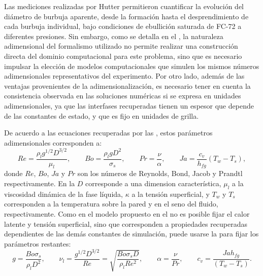 Las mediciones realizadas por Hutter permitieron cuantificar la evoluci\'on del di\'ametro de burbuja aparente, desde la formaci\'on hasta el desprendimiento de cada burbuja individual, bajo condiciones de ebullici\'on saturada de FC-72 a diferentes presiones. Sin embargo, como se detalla en el , la naturaleza adimensional del formalismo utilizado no permite realizar una construcci\'on directa del dominio computacional para este problema, sino que es necesario impulsar la elecci\'on de modelos computacionales que simulen los mismos n\'umeros adimensionales representativos del experimento. Por otro lado, adem\'as de las ventajas provenientes de la adimensionalizaci\'on, es necesario tener en cuenta la consistencia observada en las soluciones num\'ericas si se expresa en unidades adimensionales, ya que las interfases recuperadas tienen un espesor que depende de las constantes de estado, y que es fijo en unidades de grilla.

De acuerdo a las ecuaciones recuperadas por las \lbe{}, estos par\'ametros adimensionales corresponden a:
\begin{equation}
	Re = \dfrac{\rho_l g^{1/2} D^{3/2}}{\mu_l}, \qquad
	Bo = \dfrac{\rho_l g D^2}{\sigma_s}, \qquad
	Pr = \dfrac{\nu}{\alpha}, \qquad
	Ja = \dfrac{c_v}{h_{fg}}(T_w-T_s),
	\label{eq:num_adim_hetb_3D}
\end{equation}
donde $Re$, $Bo$, $Ja$ y $Pr$ son los n\'umeros de Reynolds, Bond, Jacob y Prandtl respectivamente. En la  $D$ corresponde a una dimension caracter\'istica, $\mu_l$ a la viscosidad din\'amica de la fase l\'iquida, $\kappa$ a la tensi\'on superficial, y $T_w$ y $T_s$ corresponden a la temperatura sobre la pared y en el seno del fluido, respectivamente. Como en el modelo propuesto en el  no es posible fijar el calor latente y tensi\'on superficial, sino que corresponden a propiedades recuperadas dependientes de las dem\'as constantes de simulaci\'on, puede usarse la  para fijar los par\'ametros restantes:
\begin{equation}
	g = \dfrac{Bo \sigma_s}{\rho_l D^2}, \qquad
	\nu_l = \dfrac{g^{1/2}D^{3/2}}{Re} = \sqrt{ \dfrac{Bo \sigma_s D}{\rho_l Re^2} }, \qquad
	\alpha = \dfrac{\nu}{Pr}, \qquad
	c_v = \dfrac{Ja h_{fg}}{(T_w - T_s)}.
	\label{eq:param_adim_3D}
\end{equation}


